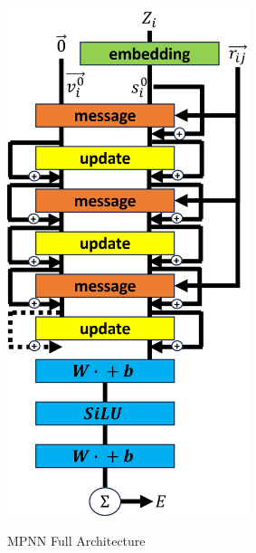 \begin{figure}[H]
    \caption{MPNN Full Architecture}
    \centering\label{img:MPNN_arc}
    \includegraphics[width=200pt]{Images/Method/MPNN_arc.png}
\end{figure}


\newpage